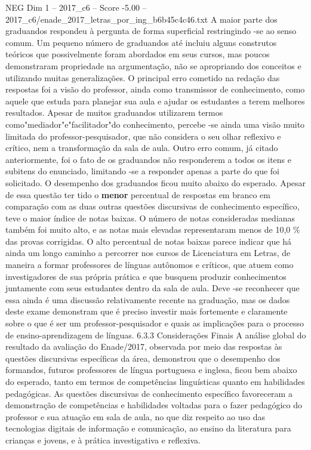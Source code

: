 \begin{textsample}{NEG Dim 1 – 2017\_c6 – Score -5.00 – 2017\_c6/enade\_2017\_letras\_por\_ing\_b6b45c4c46.txt}
A maior parte dos graduandos respondeu à pergunta de forma superficial restringindo -se ao senso comum.
Um pequeno número de graduandos até incluiu alguns construtos teóricos que possivelmente foram abordados em seus cursos, mas poucos demonstraram propriedade na argumentação, não se apropriando dos conceitos e utilizando muitas generalizações.
O principal erro cometido na redação das respostas foi a visão do professor, ainda como transmissor de conhecimento, como aquele que estuda para planejar sua aula e ajudar os estudantes a terem melhores resultados.
Apesar de muitos graduandos utilizarem termos como"mediador"e"facilitador"do conhecimento, percebe -se ainda uma visão muito limitada do professor-pesquisador, que não considera o seu olhar reflexivo e crítico, nem a transformação da sala de aula.
Outro erro comum, já citado anteriormente, foi o fato de os graduandos não responderem a todos os itens e subitens do enunciado, limitando -se a responder apenas a parte do que foi solicitado.
O desempenho dos graduandos ficou muito abaixo do esperado.
Apesar de essa questão ter tido o \textbf{menor} percentual de respostas em branco em comparação com as duas outras questões discursivas de conhecimento específico, teve o maior índice de notas baixas.
O número de notas consideradas medianas também foi muito alto, e as notas mais elevadas representaram menos de 10,0 \% das provas corrigidas.
O alto percentual de notas baixas parece indicar que há ainda um longo caminho a percorrer nos cursos de Licenciatura em Letras, de maneira a formar professores de línguas autônomos e críticos, que atuem como investigadores de sua própria prática e que busquem produzir conhecimentos juntamente com seus estudantes dentro da sala de aula.
Deve -se reconhecer que essa ainda é uma discussão relativamente recente na graduação, mas os dados deste exame demonstram que é preciso investir mais fortemente e claramente sobre o que é ser um professor-pesquisador e quais as implicações para o processo de ensino-aprendizagem de línguas. 6.3.3 Considerações Finais A análise global do resultado da avaliação do Enade/2017, observada por meio das respostas às questões discursivas específicas da área, demonstrou que o desempenho dos formandos, futuros professores de língua portuguesa e inglesa, ficou bem abaixo do esperado, tanto em termos de competências linguísticas quanto em habilidades pedagógicas.
As questões discursivas de conhecimento específico favoreceram a demonstração de competências e habilidades voltadas para o fazer pedagógico do professor e sua atuação em sala de aula, no que diz respeito ao uso das tecnologias digitais de informação e comunicação, ao ensino da literatura para crianças e jovens, e à prática investigativa e reflexiva.

\end{textsample}
